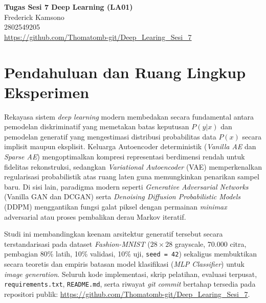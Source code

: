 \documentclass[11pt,a4paper]{article}
\begin{document}
\thispagestyle{empty}
\vspace*{\fill}
\begin{center}
  {\LARGE\bfseries Tugas Sesi 7 Deep Learning (LA01)} \\[0.8cm]
  {\large Frederick Kamsono} \\[0.25cm]
  {\large 2802549205} \\[0.4cm]
  {\normalsize \url{https://github.com/Thomatomb-git/Deep_Learing_Sesi_7}}
\end{center}
\vspace*{\fill}
\newpage

\section{Pendahuluan dan Ruang Lingkup Eksperimen}
Rekayasa sistem \textit{deep learning} modern membedakan secara fundamental antara pemodelan diskriminatif yang memetakan batas keputusan $P(y|x)$ dan pemodelan generatif yang mengestimasi distribusi probabilitas data $P(x)$ secara implisit maupun eksplisit. Keluarga Autoencoder deterministik (\textit{Vanilla AE} dan \textit{Sparse AE}) mengoptimalkan kompresi representasi berdimensi rendah untuk fidelitas rekonstruksi, sedangkan \textit{Variational Autoencoder} (VAE) memperkenalkan regularisasi probabilistik atas ruang laten guna memungkinkan penarikan sampel baru. Di sisi lain, paradigma modern seperti \textit{Generative Adversarial Networks} (Vanilla GAN dan DCGAN) serta \textit{Denoising Diffusion Probabilistic Models} (DDPM) menggantikan fungsi galat piksel dengan permainan \textit{minimax} adversarial atau proses pembalikan derau Markov iteratif.

Studi ini membandingkan keenam arsitektur generatif tersebut secara terstandarisasi pada dataset \textit{Fashion-MNIST} ($28 \times 28$ grayscale, 70.000 citra, pembagian 80\% latih, 10\% validasi, 10\% uji, \texttt{seed = 42}) sekaligus membuktikan secara teoretis dan empiris batasan model klasifikasi (\textit{MLP Classifier}) untuk \textit{image generation}. Seluruh kode implementasi, skrip pelatihan, evaluasi terpusat, \texttt{requirements.txt}, \texttt{README.md}, serta riwayat \textit{git commit} bertahap tersedia pada repositori publik: \url{https://github.com/Thomatomb-git/Deep_Learing_Sesi_7}.
\end{document}
